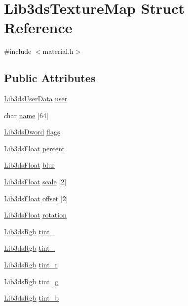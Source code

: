 \hypertarget{struct_lib3ds_texture_map}{\section{Lib3ds\-Texture\-Map Struct Reference}
\label{struct_lib3ds_texture_map}
}


{\ttfamily \#include $<$material.\-h$>$}

\subsection*{Public Attributes}
\begin{DoxyCompactItemize}
\item 
\hyperlink{union_lib3ds_user_data}{Lib3ds\-User\-Data} \hyperlink{struct_lib3ds_texture_map_ab99fff459d1d3b3f122868a8dd7f0397}{user}
\item 
char \hyperlink{struct_lib3ds_texture_map_a3cf75db1ba9ce54de41601b063a59b05}{name} \mbox{[}64\mbox{]}
\item 
\hyperlink{types_8h_a299c9663303144c562f6bd92c2f273d3}{Lib3ds\-Dword} \hyperlink{struct_lib3ds_texture_map_a9c8f2fbb0613016e0bea680d675d15d2}{flags}
\item 
\hyperlink{types_8h_ab18e70f51f9a53c9dee8d930c8e1a7bf}{Lib3ds\-Float} \hyperlink{struct_lib3ds_texture_map_a3aa9ab34e069892c431528b27babcd12}{percent}
\item 
\hyperlink{types_8h_ab18e70f51f9a53c9dee8d930c8e1a7bf}{Lib3ds\-Float} \hyperlink{struct_lib3ds_texture_map_aef8bec2970af2be3dbf50596d888328f}{blur}
\item 
\hyperlink{types_8h_ab18e70f51f9a53c9dee8d930c8e1a7bf}{Lib3ds\-Float} \hyperlink{struct_lib3ds_texture_map_a45cf73d0d2d3fa1e7ea9a007ff6a843f}{scale} \mbox{[}2\mbox{]}
\item 
\hyperlink{types_8h_ab18e70f51f9a53c9dee8d930c8e1a7bf}{Lib3ds\-Float} \hyperlink{struct_lib3ds_texture_map_ae068b340929df8d7b61cf3e9e6ab8252}{offset} \mbox{[}2\mbox{]}
\item 
\hyperlink{types_8h_ab18e70f51f9a53c9dee8d930c8e1a7bf}{Lib3ds\-Float} \hyperlink{struct_lib3ds_texture_map_ab03788d888d64cb12a86ff360005ce31}{rotation}
\item 
\hyperlink{types_8h_a7e320d64d2488320001f7f3b25168ee3}{Lib3ds\-Rgb} \hyperlink{struct_lib3ds_texture_map_aae115dc5ff00b73a2c11c773a36ef3c8}{tint\-\_}
\item 
\hyperlink{types_8h_a7e320d64d2488320001f7f3b25168ee3}{Lib3ds\-Rgb} \hyperlink{struct_lib3ds_texture_map_a3c556f6311ad8766d78c631c299ed381}{tint\-\_}
\item 
\hyperlink{types_8h_a7e320d64d2488320001f7f3b25168ee3}{Lib3ds\-Rgb} \hyperlink{struct_lib3ds_texture_map_a29940e1e4f56b01533b9d1eb78e2965b}{tint\-\_\-r}
\item 
\hyperlink{types_8h_a7e320d64d2488320001f7f3b25168ee3}{Lib3ds\-Rgb} \hyperlink{struct_lib3ds_texture_map_aa38ed1161a95a855a2787f1ffb429b67}{tint\-\_\-g}
\item 
\hyperlink{types_8h_a7e320d64d2488320001f7f3b25168ee3}{Lib3ds\-Rgb} \hyperlink{struct_lib3ds_texture_map_a44ca5bc779aecb93537f224bdaeee519}{tint\-\_\-b}
\end{DoxyCompactItemize}



